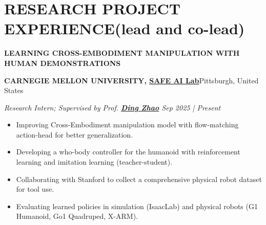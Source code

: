 \documentclass[a4paper,9pt]{extarticle}
\begin{document}
\section*{{\textbf{\fontsize{14pt}{8pt}\selectfont R}\textbf{\scshape ESEARCH PROJECT EXPERIENCE}}(lead and co-lead)}
{\textbf{\fontsize{12pt}{4pt}\selectfont L}\textbf{\scshape EARNING CROSS-EMBODIMENT MANIPULATION WITH HUMAN DEMONSTRATIONS}}
\par\vspace{4pt}\noindent
\par\textbf{CARNEGIE MELLON UNIVERSITY, {\href{https://safeai-lab.github.io/}{SAFE AI Lab}}}\hfill Pittsburgh, United States  %
\par\textit{Research Intern; Supervised by Prof. {\href{https://www.meche.engineering.cmu.edu/directory/bios/zhao-ding.html}{\textbf{Ding Zhao}}}   \hfill Sep 2025 | Present}  %
\begin{itemize}
    \item Improving Cross-Embodiment manipulation model with flow-matching action-head for better generalization.
    \item Developing a who-body controller for the humanoid with reinforcement learning and imitation learning (teacher-student).
    \item Collaborating with Stanford to collect a comprehensive physical robot dataset for tool use.
    \item Evaluating learned policies in simulation (IsaacLab) and physical robots (G1 Humanoid, Go1 Quadruped, X-ARM).  
\end{itemize}
\end{document}
